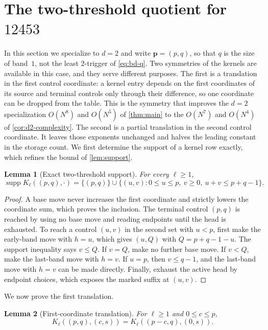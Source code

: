 \documentclass[11pt,reqno]{amsart}
\newtheorem{lemma}[lemma]{Lemma}
\theoremstyle{definition}
\theoremstyle{remark}
\newcommand{\supp}{\operatorname{supp}}
\begin{document}
\section{The two-threshold quotient for
\texorpdfstring{$12453$}{12453}}\label{sec:d2-support}

In this section we specialize to $d=2$ and write $\mathbf p=(p,q)$, so
that $q$ is the size of band~$1$, not the least $2$-trigger of
\eqref{eq:bd-q}.  Two symmetries of the kernels are
available in this case, and they serve different purposes.  The first is a
translation in the first control coordinate: a kernel entry depends on the
first coordinates of its source and terminal controls only through their
difference, so one coordinate can be dropped from the table.  This is the
symmetry that improves the $d=2$ specialization $O(N^8)$ and $O(N^5)$
of \cref{thm:main} to the $O(N^7)$ and $O(N^4)$ of \cref{cor:d2-complexity}.
The second is a partial translation in the second control coordinate.  It leaves
those exponents unchanged and halves the leading constant in the storage count.
We first determine the support of a kernel row exactly, which refines the
bound of \cref{lem:support}.

\begin{lemma}[Exact two-threshold support]\label{lem:d2-exact-support}
For every $\ell\geq1$,
\begin{equation}\label{eq:support-d2}
 \supp K_\ell((p,q),\mathord\cdot)
 =\{(p,q)\}\cup
 \{(u,v):0\leq u\leq p,\ v\geq0,\ u+v\leq p+q-1\}.
\end{equation}
\end{lemma}

\begin{proof}
A base move never increases the first coordinate and strictly lowers the
coordinate sum, which proves the inclusion.  The terminal control $(p,q)$ is
reached by using no base move and reading endpoints until the head is
exhausted.  To reach a control $(u,v)$ in the second set with $u<p$, first
make the early-band move with $h=u$, which gives $(u,Q)$ with
$Q=p+q-1-u$.  The support inequality says $v\leq Q$.  If $v=Q$, make no
further base move.  If $v<Q$, make the last-band move with $h=v$.  If
$u=p$, then $v\leq q-1$, and the last-band move with $h=v$ can be made
directly.  Finally, exhaust the active head by endpoint choices, which
exposes the marked suffix at $(u,v)$.
\end{proof}

We now prove the first translation.

\begin{lemma}[First-coordinate translation]\label{lem:d2-translation}
For $\ell\geq1$ and $0\leq c\leq p$,
\begin{equation}\label{eq:d2-translation}
 K_\ell((p,q),(c,s))=K_\ell((p-c,q),(0,s)).
\end{equation}
\end{lemma}
\end{document}
